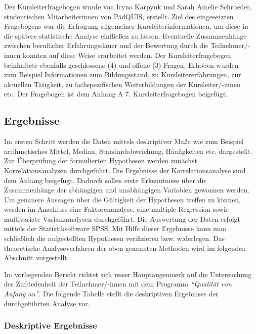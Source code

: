 \documentclass[12pt,a4paper]{article}
\begin{document}
Der Kursleiterfragebogen wurde von Iryna Karpyuk und Sarah Amelie Schroeder, studentischen Mitarbeiterinnen von PädQUIS, erstellt. Ziel des eingesetzten Fragebogens war die Erfragung allgemeiner Kursleiterinformationen, um diese in die spätere statistische Analyse einfließen zu lassen. Eventuelle Zusammenhänge zwischen beruflicher Erfahrungsdauer und der Bewertung durch die Teilnehmer/-innen konnten auf diese Weise erarbeitet werden. Der Kursleiterfragebogen beinhaltete ebenfalls geschlossene (4) und offene (3) Fragen. Erhoben wurden zum Beispiel Informationen zum Bildungsstand, zu Kursleitererfahrungen, zur aktuellen Tätigkeit, zu fachspezifischen Weiterbildungen der Kursleiter/-innen etc. Der Fragebogen ist dem Anhang A 7. Kursleiterfragebogen beigefügt.


\subsection{Ergebnisse}

Im ersten Schritt werden die Daten mittels deskriptiver Maße wie zum Beispiel arithmetisches Mittel, Median, Standardabweichung, Häufigkeiten etc. dar\-ge\-stellt. Zur Überprüfung der formulierten Hypothesen werden zunächst Korrelationsanalysen durchgeführt. Die Ergebnisse der Korrelationsanalyse sind dem Anhang beigefügt. Dadurch sollen erste Erkenntnisse über die Zusammenhänge der abhängigen und unabhängigen Variablen gewonnen werden. Um genauere Aussagen über die Gültigkeit der Hypothesen treffen zu können, werden im Anschluss eine Faktorenanalyse, eine multiple Regression sowie multivariate Varianzanalysen durchgeführt. Die Auswertung der Daten erfolgt mittels der Statistiksoftware SPSS. Mit Hilfe dieser Ergebnisse kann man schließlich die aufgestellten Hypothesen verifizieren bzw. widerlegen. Das theoretische Analyseverfahren der oben genannten Methoden wird im folgenden Abschnitt vorgestellt. 

Im vorliegenden Bericht richtet sich unser Hauptaugenmerk auf die Untersuchung der Zufriedenheit der Teilnehmer/-innen mit dem Programm \textit{"`Qualität von Anfang an"'}. Die folgende Tabelle stellt die deskriptiven Ergebnisse der durchgeführten Analyse vor. 

\subsubsection{Deskriptive Ergebnisse}
\end{document}
